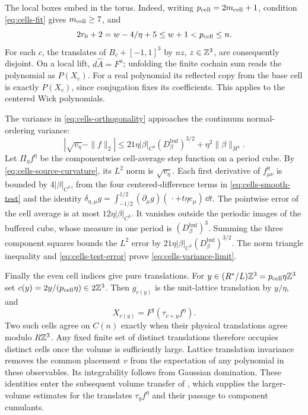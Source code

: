 The local boxes embed in the torus. Indeed, writing
$p_{\rm cell}=2m_{\rm cell}+1$, condition \eqref{eq:cells-fit} gives $m_{\rm cell}\ge7$,
and
\[
 2r_0+2=w-4/\eta+5\le w+1<p_{\rm cell}\le n.
\]
For each $c$, the translates of $B_c+[-1,1]^3$ by
$nz$, $z\in\mathbb Z^3$, are consequently disjoint.
On a local lift, $d\widehat A=F^{\mathrm u}$; unfolding
the finite cochain sum reads the polynomial as $P(X_c)$.
For a real polynomial its reflected copy from the base
cell is exactly $P(X_c)$, since conjugation fixes its
coefficients. This applies to the centered Wick polynomials.

The variance in \eqref{eq:cells-orthogonality} approaches
the continuum normal-ordering variance:
\begin{equation}\label{eq:cells-variance-limit}
 \left|\sqrt{v_\eta}-\|f\|_2\right|
 \le21\eta|\beta|_{C^3}(D_\beta^{\mathrm{buf}})^{3/2}
                      +\eta^2\|\beta\|_{H^4}.
\end{equation}
Let $\Pi_\eta f^\eta$ be the componentwise cell-average step
function on a period cube. By \eqref{eq:cells-source-curvature},
its $L^2$ norm is $\sqrt{v_\eta}$.
Each first derivative of $f^\eta_{\mu\nu}$ is bounded
by $4|\beta|_{C^3}$, from the four centered-difference
terms in \eqref{eq:cells-smooth-test} and the identity
$\delta_{\eta,\mu}g=\int_{-1/2}^{1/2}
(\partial_\mu g)(\,\cdot+t\eta e_\mu)\,\dd t$.
The pointwise error of the cell average is at most
$12\eta|\beta|_{C^3}$. It vanishes outside the periodic
images of the buffered cube, whose measure in one period
is $(D_\beta^{\mathrm{buf}})^3$.
Summing the three component squares bounds the $L^2$
error by $21\eta|\beta|_{C^3}(D_\beta^{\mathrm{buf}})^{3/2}$.
The norm triangle inequality and
\eqref{eq:cells-test-error} prove
\eqref{eq:cells-variance-limit}.

Finally the even cell indices give pure translations.
For $y\in(R^*/L)\mathbb Z^3=p_{\rm cell}\eta\mathbb Z^3$ set
$c(y)=2y/(p_{\rm cell}\eta)\in2\mathbb Z^3$. Then $g_{c(y)}$ is the unit-lattice
translation by $y/\eta$, and
\begin{equation}\label{eq:cells-translation-observable}
 X_{c(y)}=F^\sharp(\tau_{v+y}f^\eta).
\end{equation}
Two such cells agree on $C(n)$ exactly when their physical
translations agree modulo $R\mathbb Z^3$. Any fixed finite set
of distinct translations therefore occupies distinct
cells once the volume is sufficiently large.
Lattice translation invariance removes the common placement
$v$ from the expectation of any polynomial in these
observables. Its integrability follows from Gaussian
domination. These identities enter the subsequent volume transfer of
\cite[Theorem~A]{VolumeTransfer}, which supplies the larger-volume estimates
for the translates $\tau_yf^\eta$ and their passage to component cumulants.


